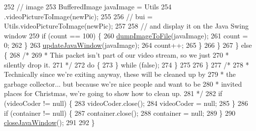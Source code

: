 \begin{DoxyCode}
252                         \textcolor{comment}{// image}
253                         BufferedImage javaImage = Utils
254                                 .videoPictureToImage(newPic);
255 
256                         \textcolor{comment}{// bui = Utils.videoPictureToImage(newPic);}
257 
258                         \textcolor{comment}{// and display it on the Java Swing window}
259                         \textcolor{keywordflow}{if} (count == 100) \{
260                             \hyperlink{classworkspace_1_1_a_r_drone_stream_image_1_1src_1_1_decode_and_play_video_a4b64105523009d77a348998cce13aa15}{dumpImageToFile}(javaImage);
261                             count = 0;
262                         \}
263                         \hyperlink{classworkspace_1_1_a_r_drone_stream_image_1_1src_1_1_decode_and_play_video_a6db6d52da537beedda90a3fa39ce85af}{updateJavaWindow}(javaImage);
264                         count++;
265                     \}
266                 \}
267             \} \textcolor{keywordflow}{else} \{
268                 \textcolor{comment}{/*}
269 \textcolor{comment}{                 * This packet isn't part of our video stream, so we just
}
270 \textcolor{comment}{                 * silently drop it.
}
271 \textcolor{comment}{                 */}
272                 \textcolor{keywordflow}{do} \{
273                 \} \textcolor{keywordflow}{while} (\textcolor{keyword}{false});
274             \}
275 
276         \}
277         \textcolor{comment}{/*}
278 \textcolor{comment}{         * Technically since we're exiting anyway, these will be cleaned up by
}
279 \textcolor{comment}{         * the garbage collector... but because we're nice people and want to be
}
280 \textcolor{comment}{         * invited places for Christmas, we're going to show how to clean up.
}
281 \textcolor{comment}{         */}
282         \textcolor{keywordflow}{if} (videoCoder != null) \{
283             videoCoder.close();
284             videoCoder = null;
285         \}
286         \textcolor{keywordflow}{if} (container != null) \{
287             container.close();
288             container = null;
289         \}
290         \hyperlink{classworkspace_1_1_a_r_drone_stream_image_1_1src_1_1_decode_and_play_video_a63333fed325f6ec886cf76f9704cf6f0}{closeJavaWindow}();
291 
292     \}
\end{DoxyCode}


